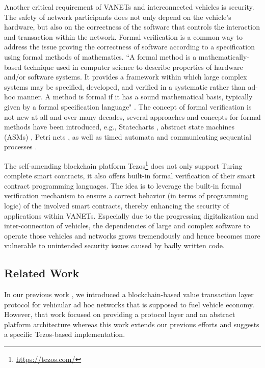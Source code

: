 \documentclass{llncs}
\begin{document}
{			Another critical requirement of VANETs and interconnected vehicles is security. The safety of network participants does not only depend on the vehicle's hardware, but also on the correctness of the software that controls the interaction and transaction within the network. Formal verification is a common way to address the issue proving the correctness of software according to a specification using formal methods of mathematics. ``A formal method is a mathematically-based technique used in computer science to describe properties of hardware and/or software systems. It provides a framework within which large complex systems may be specified, developed, and verified in a systematic rather than ad-hoc manner. A method is formal if it has a sound mathematical basis, typically given by a formal specification language" \cite{wing1990specifier}. The concept of formal verification is not new at all and over many decades, several approaches and concepts for formal methods have been introduced, e.g., Statecharts \cite{harel1987statecharts}, abstract state machines (ASMs) \cite{gurevich1995evolving}, Petri nets \cite{petri1962kommunikation}, as well as timed automata \cite{alur1994theory} and communicating sequential processes \cite{hoare1978communicating}.
						
			The self-amending blockchain platform Tezos\footnote{\url{https://tezos.com/}} \cite{tezosWhitepaper} does not only support Turing complete smart contracts, it also offers built-in formal verification of their smart contract programming languages. The idea is to leverage the built-in formal verification mechanism to ensure a correct behavior (in terms of programming logic) of the involved smart contracts, thereby enhancing the security of applications within VANETs. Especially due to the progressing digitalization and inter-connection of vehicles, the dependencies of large and complex software to operate those vehicles and networks grows tremendously and hence becomes more vulnerable to unintended security issues caused by badly written code.

			
		
		\subsection{Related Work}
			\label{ss:related-work}

			In our previous work \cite{chorusWhitepaper}\cite{chorus2018MCIS}, we introduced a blockchain-based value transaction layer protocol for vehicular ad hoc networks that is supposed to fuel vehicle economy. However, that work focused on providing a protocol layer and an abstract platform architecture whereas this work extends our previous efforts and suggests a specific Tezos-based implementation.

}
\end{document}
